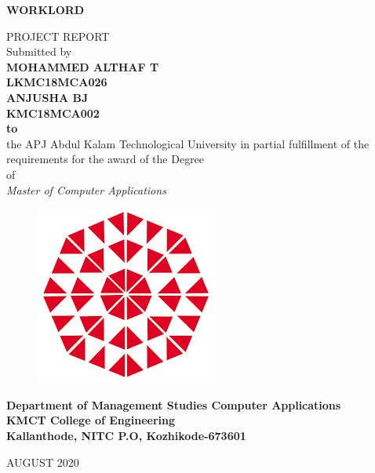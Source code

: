 \documentclass[a4paper,12pt]{report}
\begin{document}
{\centering \bf \large
	WORKLORD\par
}
\begin{center}
	{\small PROJECT REPORT} \vspace*{10pt}
	\\ Submitted by\\
	\vspace*{15pt}
	{\bf MOHAMMED ALTHAF T\\
\vspace*{8pt}	LKMC18MCA026\\

\vspace*{8pt}ANJUSHA BJ\\
\vspace*{8pt}KMC18MCA002\\
	\vspace*{20pt}
	to}\\
	\vspace*{13pt}
	the APJ Abdul Kalam Technological University in partial fulfillment of
	the requirements for the award of the Degree\\
	\vspace*{10pt} of\\
	\vspace*{10pt} \textit{ Master of Computer Applications
	} 
\vspace*{10pt}
\begin{figure}[bph]
	\centering
	\includegraphics[width=0.3023\linewidth]{kmct}
	\label{fig:ksblogo}
\end{figure}

	\bf{Department of Management Studies  Computer Applications
	\vspace*{15pt}
	\\KMCT College of Engineering
	\vspace*{10pt}
	\\Kallanthode, NITC P.O, Kozhikode-673601}

\end{center}
	\begin{center}
		\vspace*{15pt}AUGUST 2020
	\end{center}
\end{document}
